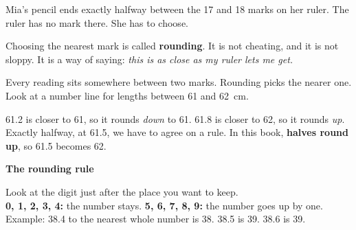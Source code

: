 \label{ch2}

Mia's pencil ends exactly halfway between the 17 and 18 marks on her ruler. The ruler has no mark there. She has to choose.

Choosing the nearest mark is called \textbf{rounding}. It is not cheating, and it is not sloppy. It is a way of saying: \emph{this is as close as my ruler lets me get.}

Every reading sits somewhere between two marks. Rounding picks the nearer one. Look at a number line for lengths between 61 and 62~cm.

\begin{center}
\end{center}

61.2 is closer to 61, so it rounds \emph{down} to 61. 61.8 is closer to 62, so it rounds \emph{up}. Exactly halfway, at 61.5, we have to agree on a rule. In this book, \textbf{halves round up}, so 61.5 becomes 62.

\begin{tcolorbox}[colback=sun!14,colframe=sun!85!black,boxrule=1.2pt,arc=2mm,left=6pt,right=6pt,top=4pt,bottom=4pt,before skip=8pt,after skip=8pt]
\sans\bfseries\color{ink} The rounding rule\par
\normalfont\sffamily\small Look at the digit just after the place you want to keep.\\
\textbf{0, 1, 2, 3, 4:} the number stays. \qquad \textbf{5, 6, 7, 8, 9:} the number goes up by one.\\
Example: 38.4 to the nearest whole number is 38. 38.5 is 39. 38.6 is 39.
\end{tcolorbox}

